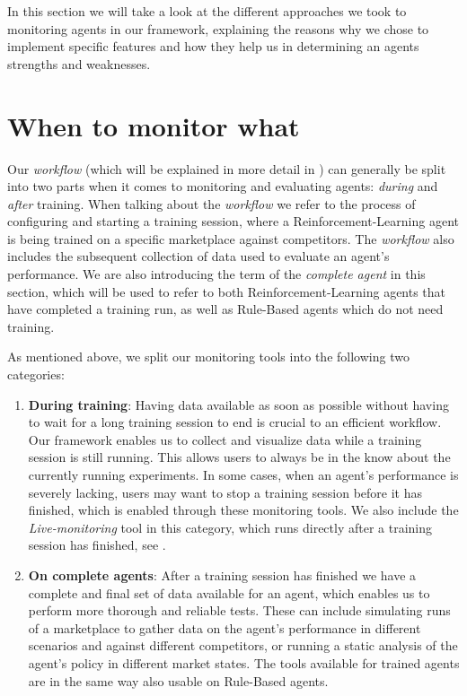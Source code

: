 \begin{jointwork}\label{ch:Approaches}
	In this section we will take a look at the different approaches we took to monitoring agents in our framework, explaining the reasons why we chose to implement specific features and how they help us in determining an agents strengths and weaknesses.
\end{jointwork}

\section{When to monitor what}\label{sec:WhenToMonitorWhat}

Our \emph{workflow} (which will be explained in more detail in ) can generally be split into two parts when it comes to monitoring and evaluating agents: \emph{during} and \emph{after} training. When talking about the \emph{workflow} we refer to the process of configuring and starting a training session, where a Reinforcement-Learning agent is being trained on a specific marketplace against competitors. The \emph{workflow} also includes the subsequent collection of data used to evaluate an agent's performance. We are also introducing the term of the \emph{complete agent} in this section, which will be used to refer to both Reinforcement-Learning agents that have completed a training run, as well as Rule-Based agents which do not need training.

As mentioned above, we split our monitoring tools into the following two categories:

\begin{enumerate}
	\item \textbf{During training}: Having data available as soon as possible without having to wait for a long training session to end is crucial to an efficient workflow. Our framework enables us to collect and visualize data while a training session is still running. This allows users to always be in the know about the currently running experiments. In some cases, when an agent's performance is severely lacking, users may want to stop a training session before it has finished, which is enabled through these monitoring tools. We also include the \emph{Live-monitoring} tool in this category, which runs directly after a training session has finished, see .

	\item \textbf{On complete agents}: After a training session has finished we have a complete and final set of data available for an agent, which enables us to perform more thorough and reliable tests. These can include simulating runs of a marketplace to gather data on the agent's performance in different scenarios and against different competitors, or running a static analysis of the agent's policy in different market states. The tools available for trained agents are in the same way also usable on Rule-Based agents.
\end{enumerate}

